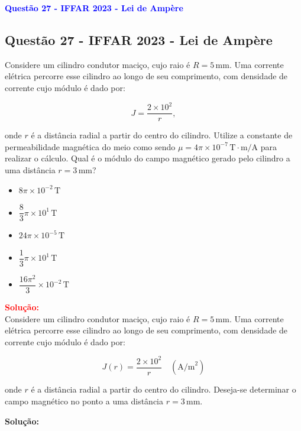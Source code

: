 \begin{flushleft}
\textbf{\textcolor{blue}{\Large Quest\~ao 27 - IFFAR 2023 - Lei de Amp\`ere}}\\

\subsection{Quest\~ao 27 - IFFAR 2023 - Lei de Amp\`ere}

Considere um cilindro condutor maci\c{c}o, cujo raio \'e $R = 5\,\text{mm}$. Uma corrente el\'etrica percorre esse 
cilindro ao longo de seu comprimento, com densidade de corrente cujo m\'odulo \'e dado por:

\[
J = \frac{2 \times 10^2}{r},
\]

onde $r$ \'e a dist\^ancia radial a partir do centro do cilindro. Utilize a constante de permeabilidade magn\'etica 
do meio como sendo $\mu = 4\pi \times 10^{-7} \, \text{T} \cdot \text{m/A}$ para realizar o c\'alculo. Qual \'e o 
m\'odulo do campo magn\'etico gerado pelo cilindro a uma dist\^ancia $r = 3\,\text{mm}$?

\begin{itemize}
\item[(A)] $8\pi \times 10^{-2} \, \text{T}$
\item[(B)] $\dfrac{8}{3} \pi \times 10^1 \, \text{T}$
\item[(C)] $24\pi \times 10^{-5} \, \text{T}$
\item[(D)] $\dfrac{1}{3} \pi \times 10^1 \, \text{T}$
\item[(E)] $\dfrac{16\pi^2}{3} \times 10^{-2} \, \text{T}$
\end{itemize}

\vspace{0.5cm}

\textcolor{red}{\textbf{Solução:}}\\

Considere um cilindro condutor maci\c{c}o, cujo raio \'e $R = 5\,\text{mm}$. Uma corrente el\'etrica percorre esse cilindro ao longo de seu comprimento, com densidade de corrente cujo m\'odulo \'e dado por:

\[
J(r) = \frac{2 \times 10^2}{r} \quad (\text{A/m}^2)
\]

onde $r$ \'e a dist\^ancia radial a partir do centro do cilindro. Deseja-se determinar o campo magn\'etico no ponto a uma dist\^ancia $r = 3\,\text{mm}$.

\vspace{0.4cm}
\textbf{Solução:}


\end{flushleft}
